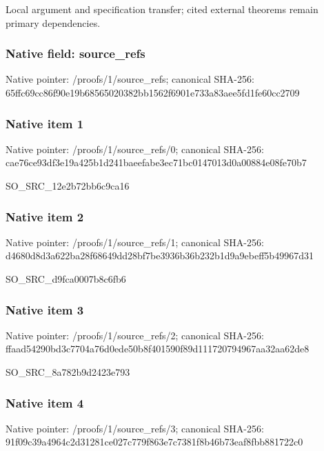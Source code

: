 \documentclass[10pt,a4paper]{article}
\begin{document}
Local argument and specification transfer; cited external theorems remain primary dependencies.


\subsubsection{Native field: source\_refs}


Native pointer: /proofs/1/source\_refs; canonical SHA-256: 65ffc69cc86f90e19b685650\allowbreak{}20382bb1562f6901e733a83a\allowbreak{}ee5fd1fe60cc2709



\subsubsection{Native item 1}


Native pointer: /proofs/1/source\_refs/0; canonical SHA-256: cae76ce93df3e19a425b1d24\allowbreak{}1baeefabe3ec71bc0147013d\allowbreak{}0a00884e08fe70b7


SO\_SRC\_12e2b72bb6c9ca16


\subsubsection{Native item 2}


Native pointer: /proofs/1/source\_refs/1; canonical SHA-256: d4680d8d3a622ba28f68649d\allowbreak{}d28bf7be3936b36b232b1d9a\allowbreak{}9ebeff5b49967d31


SO\_SRC\_d9fca0007b8c6fb6


\subsubsection{Native item 3}


Native pointer: /proofs/1/source\_refs/2; canonical SHA-256: ffaad54290bd3c7704a76d0e\allowbreak{}de50b8f401590f89d1117207\allowbreak{}94967aa32aa62de8


SO\_SRC\_8a782b9d2423e793


\subsubsection{Native item 4}


Native pointer: /proofs/1/source\_refs/3; canonical SHA-256: 91f09c39a4964c2d31281ce0\allowbreak{}27c779f863e7c7381f8b46b7\allowbreak{}3eaf8fbb881722c0
\end{document}
